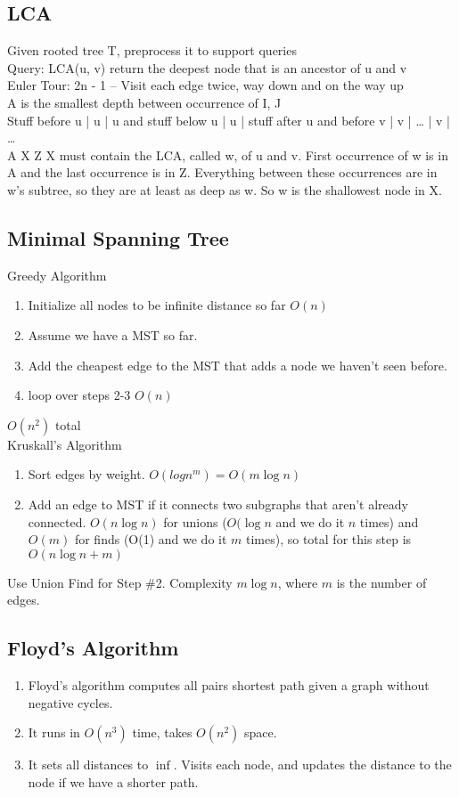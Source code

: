 \documentclass[12pt,twocolumn]{article}
\begin{document}
\subsection{LCA}
Given rooted tree T, preprocess it to support queries\\
Query: LCA(u, v) return the deepest node that is an ancestor of u and v\\
Euler Tour:
2n - 1 -- Visit each edge twice, way down and on the way up\\
A is the smallest depth between occurrence of I, J\\
Stuff before u | u | u and stuff below u | u | stuff after u and before v | v | … | v | …\\
    A                       X             Z
X must contain the LCA, called w, of u and v.  First occurrence of w is in A and the last occurrence is in Z.
Everything between these occurrences are in w’s subtree, so they are at least as deep as w.  So w is the shallowest node in X.\\


\subsection{Minimal Spanning Tree}
Greedy Algorithm
\begin{enumerate}
    \item Initialize all nodes to be infinite distance so far $O(n)$
    \item Assume we have a MST so far.
    \item Add the cheapest edge to the MST that adds a node we haven't seen before.
    \item loop over steps 2-3 $O(n)$
\end{enumerate}
$O(n^2)$ total\\


Kruskall's Algorithm
\begin{enumerate}
    \item Sort edges by weight. $O(logn^m) = O(m\log{n})$
    \item Add an edge to MST if it connects two subgraphs that aren't already connected. $O(n\log{n})$ for
        unions ($O(\log{n}$ and we do it $n$ times) and $O(m)$ for finds (O(1) and we do it $m$ times), so total for this step is $O(n\log{n}+m)$
\end{enumerate}

Use Union Find for Step \#2. Complexity $m \log n$, where $m$ is the number of edges.

\subsection{Floyd's Algorithm}
\begin{enumerate}
    \item Floyd's algorithm computes all pairs shortest path given a graph without negative cycles.
    \item It runs in $O(n^3)$ time, takes $O(n^2)$ space.
    \item It sets all distances to $\inf$. Visits each node, and updates the distance to the node if we have a shorter path.
\end{enumerate}
\end{document}
